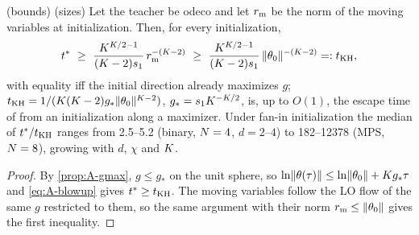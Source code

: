 \begin{corollary}\label{cor:A-kh}
  \proven{} (bounds) \empirical{} (sizes) 
  Let the teacher be odeco and let $r_{\rm m}$ be the norm of the moving variables at initialization.
  Then, for every initialization,
  \begin{equation}\label{eq:A-kh}
    t^*\ \ge\ \frac{\Kc^{\Kc/2-1}}{(\Kc-2)\tw1}\,r_{\rm m}^{-(\Kc-2)}\ \ge\
    \frac{\Kc^{\Kc/2-1}}{(\Kc-2)\tw1}\,\norm{\params_0}^{-(\Kc-2)}=:t_{\rm KH},
  \end{equation}
  with equality iff the initial direction already maximizes $g$; $t_{\rm KH}=1/(K(K-2)g_*\lVert\theta_0\rVert^{K-2})$,
  $g_*=s_{1}K^{-K/2}$, is, up to $O(1)$, the escape time of \citet[text before Thm~11]{kumar2025towards}
  from an initialization along a maximizer. Under fan-in initialization the median of $t^*/t_{\rm KH}$ ranges from 2.5--5.2 (binary,
  $N=4$, $d=2$--$4$) to 182--12378 (MPS, $N=8$), growing with $d$, $\chi$ and $K$.
\end{corollary}
\begin{proof}
  By \cref{prop:A-gmax}, $g\le g_*$ on the unit sphere, so $\ln\lVert\theta(\tau)\rVert\le\ln\lVert\theta_0\rVert+K g_*\tau$
  and \eqref{eq:A-blowup} gives $t^*\ge t_{\rm KH}$. The moving variables follow the LO flow of the same $g$
  restricted to them, so the same argument with their norm $r_{\rm m}\le\lVert\theta_0\rVert$ gives the first
  inequality.
\end{proof}


